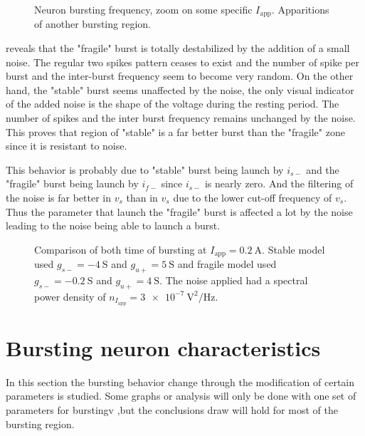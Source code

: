 \begin{figure}[!htb]
    \centering
    \caption{Neuron bursting frequency, zoom on some specific $I_\text{app}$. Apparitions of another bursting region.}
    \label{fig:neuron_burts_fragile}
\end{figure}

 reveals that the "fragile" burst is totally destabilized by the addition of a small noise.
The regular two spikes pattern ceases to exist and the number of spike per burst and the inter-burst frequency seem to become very random. 
On the other hand, the "stable" burst seems unaffected by the noise, the only visual indicator of the added noise is the shape of the voltage during the resting period.
The number of spikes and the inter burst frequency remains unchanged by the noise.
This proves that region of "stable" is a far better burst than the "fragile" zone since it is resistant to noise.

This behavior is probably due to "stable" burst being launch by $i_{s-}$ and the "fragile" burst being launch by $i_{f-}$ since $i_{s-}$ is nearly zero. 
And the filtering of the noise is far better in $v_s$ than in $v_s$ due to the lower cut-off frequency of $v_s$.
Thus the parameter that launch the "fragile" burst is affected a lot by the noise leading to the noise being able to launch a burst. 

\begin{figure}[!htb]
    \centering
    \caption{Comparison of both time of bursting at $I_\text{app}=\qty{0.2}{\ampere}$. Stable model used $g_{s-}=\qty{-4}{\siemens}$ and $g_{u+}=\qty{5}{\siemens}$ and fragile model used $g_{s-}=\qty{-0.2}{\siemens}$ and $g_{u+}=\qty{4}{\siemens}$. The noise applied had a spectral power density of  $n_{I_\text{app}} = \qty{3e-7}{\volt\squared\per\hertz}$.}
    \label{fig:neuron_burts_comp}
\end{figure}

\section{Bursting neuron characteristics}

In this section the bursting behavior change through the modification of certain parameters is studied. 
Some graphs or analysis will only be done with one set of parameters for burstingv
,but the conclusions draw will hold for most of the bursting region. 


